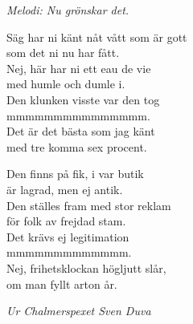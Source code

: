 {\footnotesize\textit{Melodi: Nu grönskar det.}}\par
\vspace{10pt}
Säg har ni känt nåt vått som är gott\\
som det ni nu har fått.\\
Nej, här har ni ett eau de vie\\
med humle och dumle i.\\
Den klunken visste var den tog\\
mmmmmmmmmmmmmmm.\\
Det är det bästa som jag känt\\
med tre komma sex procent.\par
\vspace{10pt}
Den finns på fik, i var butik\\
är lagrad, men ej antik.\\
Den ställes fram med stor reklam\\
för folk av frejdad stam.\\
Det krävs ej legitimation\\
mmmmmmmmmmmmm.\\
Nej, frihetsklockan högljutt slår,\\
om man fyllt arton år.\par
\vspace{10pt}
{\footnotesize\textit{Ur Chalmerspexet Sven Duva}}
